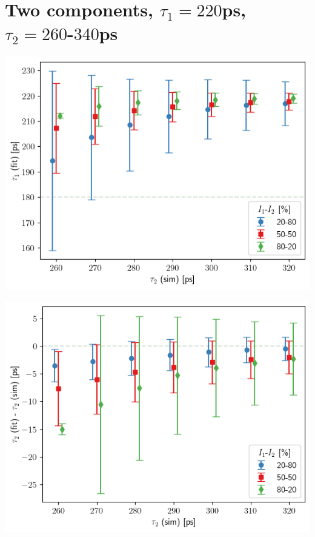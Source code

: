 \section{\boldmath Two components, $\tau_1 = 220$ps, $\tau_2=260$-$340$ps \unboldmath}
\vfill

\begin{minipage}{.5\linewidth}
    \centering
    \includegraphics[width=\linewidth]{Batch 3/regular IRF/tau1 220/output/plotfin/t1.png}
    \label{fig:220-t1}
\end{minipage}
\begin{minipage}{.5\linewidth}
    \centering
    \includegraphics[width=\linewidth]{Batch 3/regular IRF/tau1 220/output/plotfin/t2.png}
    \label{fig:220-t2}
\end{minipage}
